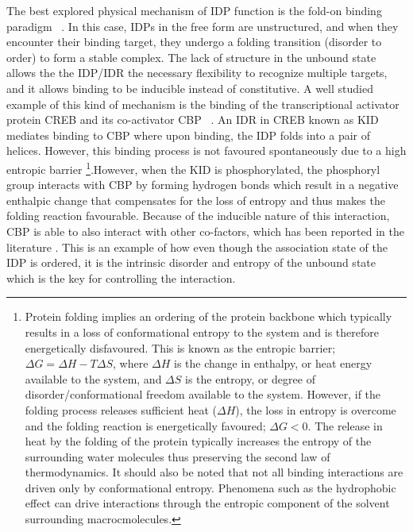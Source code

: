 The best explored physical mechanism of IDP function is the fold-on binding paradigm ~\cite{wright2009linking}. In this case, IDPs in the free form are unstructured, and when they encounter their binding target, they undergo a folding transition (disorder to order) to form a stable complex. The lack of structure in the unbound state allows the the IDP/IDR the necessary flexibility to recognize multiple targets, and it allows binding to be inducible instead of constitutive. A well studied example of this kind of mechanism is the binding of the transcriptional activator protein CREB and its co-activator CBP ~\cite{gianni2012folding}. An IDR in CREB known as KID mediates binding to CBP where upon binding, the IDP folds into a pair of helices. However, this binding process is not favoured spontaneously due to a high entropic barrier \footnote{Protein folding implies an ordering of the protein backbone which typically results in a loss of conformational entropy to the system and is therefore energetically disfavoured. This is known as the entropic barrier; $\Delta G = \Delta H - T\Delta S$, where $\Delta H$ is the change in enthalpy, or heat energy available to the system, and $\Delta S$ is the entropy, or degree of disorder/conformational freedom available to the system. However, if the folding process releases sufficient heat ($\Delta H$), the loss in entropy is overcome and the folding reaction is energetically favoured; $\Delta G < 0$. The release in heat by the folding of the protein typically increases the entropy of the surrounding water molecules thus preserving the second law of thermodynamics. It should also be noted that not all binding interactions are driven only by conformational entropy. Phenomena such as the hydrophobic effect can drive interactions through the entropic component of the solvent surrounding macrocmolecules. }.However, when the KID is phosphorylated, the phosphoryl group interacts with CBP by forming hydrogen bonds which result in a negative enthalpic change that compensates for the loss of entropy and thus makes the folding reaction favourable. Because of the inducible nature of this interaction, CBP is able to also interact with other co-factors, which has been reported in the literature \cite{radhakrishnan1997solution}. This is an example of how even though the association state of the IDP is ordered, it is  the intrinsic disorder and entropy of the unbound state which is the key for controlling the interaction. \\


\pagebreak

